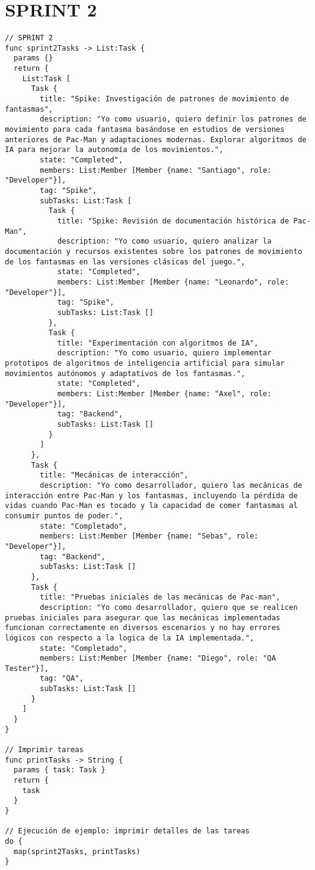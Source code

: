\documentclass{article}
\begin{document}
\section{SPRINT 2}
\begin{verbatim}
// SPRINT 2
func sprint2Tasks -> List:Task {
  params {}
  return {
    List:Task [
      Task {
        title: "Spike: Investigación de patrones de movimiento de fantasmas",
        description: "Yo como usuario, quiero definir los patrones de movimiento para cada fantasma basándose en estudios de versiones anteriores de Pac-Man y adaptaciones modernas. Explorar algoritmos de IA para mejorar la autonomía de los movimientos.",
        state: "Completed",
        members: List:Member [Member {name: "Santiago", role: "Developer"}],
        tag: "Spike",
        subTasks: List:Task [
          Task {
            title: "Spike: Revisión de documentación histórica de Pac-Man",
            description: "Yo como usuario, quiero analizar la documentación y recursos existentes sobre los patrones de movimiento de los fantasmas en las versiones clásicas del juego.",
            state: "Completed",
            members: List:Member [Member {name: "Leonardo", role: "Developer"}],
            tag: "Spike",
            subTasks: List:Task []
          },
          Task {
            title: "Experimentación con algoritmos de IA",
            description: "Yo como usuario, quiero implementar prototipos de algoritmos de inteligencia artificial para simular movimientos autónomos y adaptativos de los fantasmas.",
            state: "Completed",
            members: List:Member [Member {name: "Axel", role: "Developer"}],
            tag: "Backend",
            subTasks: List:Task []
          }
        ]
      },
      Task {
        title: "Mecánicas de interacción",
        description: "Yo como desarrollador, quiero las mecánicas de interacción entre Pac-Man y los fantasmas, incluyendo la pérdida de vidas cuando Pac-Man es tocado y la capacidad de comer fantasmas al consumir puntos de poder.",
        state: "Completado",
        members: List:Member [Member {name: "Sebas", role: "Developer"}],
        tag: "Backend",
        subTasks: List:Task []
      },
      Task {
        title: "Pruebas iniciales de las mecánicas de Pac-man",
        description: "Yo como desarrollador, quiero que se realicen pruebas iniciales para asegurar que las mecánicas implementadas funcionan correctamente en diversos escenarios y no hay errores lógicos con respecto a la logica de la IA implementada.",
        state: "Completado",
        members: List:Member [Member {name: "Diego", role: "QA Tester"}],
        tag: "QA",
        subTasks: List:Task []
      }
    ]
  }
}

// Imprimir tareas
func printTasks -> String {
  params { task: Task }
  return {
    task 
  }
}

// Ejecución de ejemplo: imprimir detalles de las tareas
do {
  map(sprint2Tasks, printTasks)
}
\end{verbatim}
\end{document}

